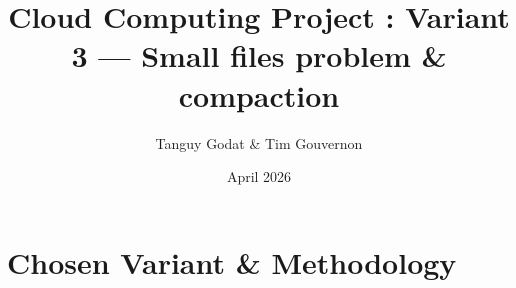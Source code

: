 \documentclass{article}
\title{Cloud Computing Project : Variant 3 — Small files problem \& compaction}
\author{Tanguy Godat \& Tim Gouvernon}
\date{April 2026}
\begin{document}
\maketitle

\section{Chosen Variant \& Methodology}
\end{document}
